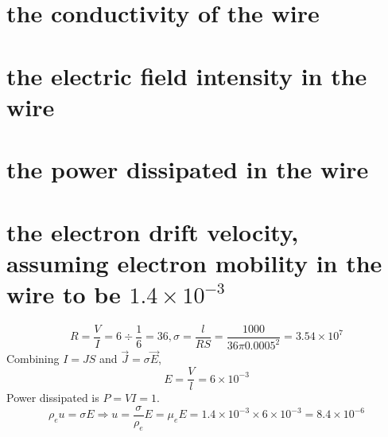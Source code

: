 \documentclass[answers]{exam}
\begin{document}
\begin{questions}

\begin{parts}
	\part{the conductivity of the wire}
	\part{the electric field intensity in the wire}
	\part{the power dissipated in the wire}
	\part{the electron drift velocity, assuming electron mobility in the wire to be $1.4\times10^{-3}$}
\end{parts}

\begin{solution}
	$$R = \frac{V}{I} = 6 \div \frac{1}{6} = 36, \sigma = \frac{l}{RS} = \frac{1000}{36\pi0.0005^2} = 3.54\times10^7$$
	Combining $I=JS$ and $\vec J = \sigma \vec E$,
	$$E = \frac{V}{l} = 6\times10^{-3}$$
	Power dissipated is $P=VI = 1$. \\
	$$\rho_e u = \sigma E \Rightarrow u = \frac{\sigma}{\rho_e} E = \mu_e E = 1.4 \times 10^{-3} \times 6 \times 10^{-3} = 8.4 \times 10^{-6}$$
\end{solution}



\end{questions}
\end{document}
